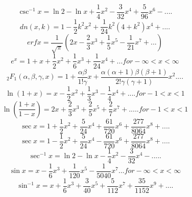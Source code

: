 \begin{equation}
	\csc^{-1} x = \ln 2 - \ln x + \frac{1}{4} x^2 - \frac{3}{32} x^4 + \frac{5}{96} x^6 - ....
\end{equation}
\begin{equation}
	dn(x,k) = 1 - \frac{1}{2} k^2 x^2 + \frac{1}{24} k^2 (4+k^2) x^4 + ....
\end{equation}
\begin{equation}
	erf x = \frac{1}{\sqrt{\pi}} (2x - \frac{2}{3} x^3 + \frac{1}{5} x^5 - \frac{1}{21}x^7 + ...) 
\end{equation}
\begin{equation}
	e^x = 1 + x + \frac{1}{2} x^2 + \frac{1}{6} x^3 + \frac{1}{24} x^4 + ... for - \infty < x < \infty 
\end{equation}
\begin{equation}
	_{2}F_{1} (\alpha,\beta,\gamma,x) = 1 + \frac{\alpha\beta}{1!\gamma} x + \frac{\alpha(\alpha + 1)\beta(\beta + 1)}{2!\gamma(\gamma + 1)} x^2 ....
\end{equation}
\begin{equation}
	\ln(1 + x) = x - \frac{1}{2} x^2 + \frac{1}{3} x^3 - \frac{1}{4} x^4 + ....for -1 < x < 1 
\end{equation}
\begin{equation}
	\ln (\frac{1+x}{1-x}) = 2x + \frac{2}{3} x^3 + \frac{2}{5} x^5 + \frac{2}{7} x^7 + ..... for -1 < x < 1 
\end{equation}
\begin{equation}
	\sec x = 1 + \frac{1}{2} x^2 + \frac{5}{24} x^4 + \frac{61}{720} x^6 + \frac{277}{8064} x^8 + ....
\end{equation}
\begin{equation}
	\sec x = 1 - \frac{1}{2} x^2 + \frac{5}{24} x^4 - \frac{61}{720} x^6 + \frac{277}{8064} x^8 + ....
\end{equation}
\begin{equation}
	\sec^{-1} x = \ln 2 - \ln x - \frac{1}{4} x^2 - \frac{3}{32} x^4 - .....
\end{equation}
\begin{equation}
	\sin x = x - \frac{1}{6} x^3 + \frac{1}{120} x^5 - \frac{1}{5040} x^7 ... for - \infty < x < \infty 
\end{equation}
\begin{equation}
	\sin^{-1} x = x + \frac{1}{6} x^3 + \frac{3}{40} x^5 + \frac{5}{112} x^7 + \frac{35}{1152} x^9 + ....
\end{equation}
